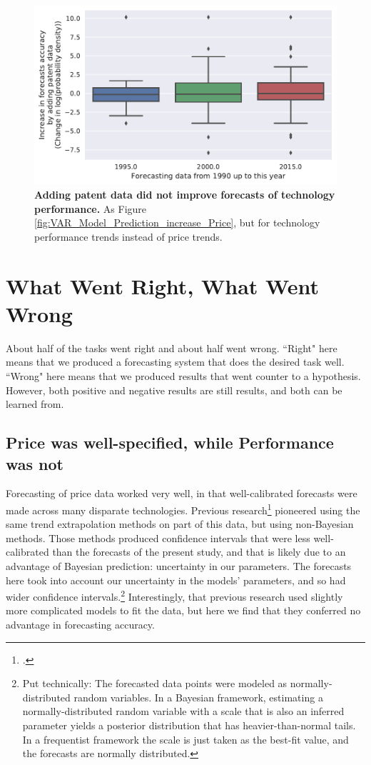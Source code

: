 \documentclass{article}
\begin{document}
\begin{figure}
    \centering
    \includegraphics[width=.75\textwidth]{figs/VAR_Model_Prediction_increase_Performance.pdf}
    \caption{\textbf{Adding patent data did not improve forecasts of technology performance.} As Figure \ref{fig:VAR_Model_Prediction_increase_Price}, but for technology performance trends instead of price trends.}
    \label{fig:VAR_Model_Prediction_increase_Performance}
\end{figure}

\section{What Went Right, What Went Wrong}
About half of the tasks went right and about half went wrong. ``Right" here means that we produced a forecasting system that does the desired task well. ``Wrong" here means that we produced results that went counter to a hypothesis. However, both positive and negative results are still results, and both can be learned from. 

\subsection{Price was well-specified, while Performance was not}
Forecasting of price data worked very well, in that well-calibrated forecasts were made across many disparate technologies. Previous research\footcite{Farmer2016} pioneered using the same trend extrapolation methods on part of this data, but using non-Bayesian methods. Those methods produced confidence intervals that were less well-calibrated than the forecasts of the present study, and that is likely due to an advantage of Bayesian prediction: uncertainty in our parameters. The forecasts here took into account our uncertainty in the models' parameters, and so had wider confidence intervals.\footnote{Put technically: The forecasted data points were modeled as normally-distributed random variables. In a Bayesian framework, estimating a normally-distributed random variable with a scale that is also an inferred parameter yields a posterior distribution that has heavier-than-normal tails. In a frequentist framework the scale is just taken as the best-fit value, and the forecasts are normally distributed.} Interestingly, that previous research used slightly more complicated models to fit the data, but here we find that they conferred no advantage in forecasting accuracy.
\end{document}
